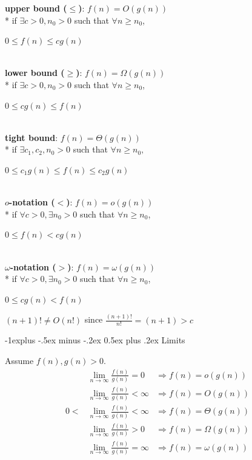\documentclass[10pt, landscape]{article}
\makeatletter
\renewcommand{\subsection}{\@startsection{subsection}{2}{0mm}%
  {-1explus -.5ex minus -.2ex}%
  {0.5ex plus .2ex}%
{\normalfont\normalsize\bfseries}}
\makeatother
\begin{document}
\begin{multicols*}{4}
  \begin{tightcenter}
    \textbf{upper bound ($\leq$)}: $f(n) = O(g(n))$
    \\* if $\exists c>0, n_0>0$ such that $\forall n \geq n_0$, 
    \begin{tightbox}
      $0 \leq f(n) \leq cg(n)$
    \end{tightbox}
    

    \ \\ \textbf{lower bound ($\geq$)}: $f(n) = \Omega(g(n))$
    \\* if $\exists c>0, n_0>0$ such that $\forall n \geq n_0$, 
    \begin{tightbox}
      $0 \leq cg(n) \leq f(n)$
    \end{tightbox}

    \ \\ \textbf{tight bound}: $f(n) = \Theta(g(n))$
    \\* if $\exists c_1, c_2, n_0>0$ such that $\forall n \geq n_0,$
    \begin{tightbox}
      $0 \leq c_1 g(n) \leq f(n) \leq c_2 g(n)$ 
    \end{tightbox}

    \ \\ \textbf{$o$-notation ($<$)}: $f(n) = o(g(n))$
    \\* if $\forall c>0, \exists n_0>0$ such that $\forall n \geq n_0$, 
    \begin{tightbox}
      $0 \leq f(n) < cg(n)$
    \end{tightbox}

    \ \\ \textbf{$\omega$-notation ($>$)}: $f(n) = \omega(g(n))$
    \\* if $\forall c>0, \exists n_0>0$ such that $\forall n \geq n_0$, 
    \begin{tightbox}
      $0 \leq cg(n) < f(n)$
    \end{tightbox}
  \end{tightcenter}

  \begin{niceproof}
    $(n+1)! \ne O(n!)$ since $\frac{(n+1)!}{n!}=(n+1)>c$
  \end{niceproof}

  \subsection{Limits}

  Assume $f(n), g(n) > 0$.
  \begin{align*}
    &\lim\limits_{n \to \infty} \frac{f(n)}{g(n)} = 0 &\Rightarrow f(n) = o(g(n)) \\
    &\lim\limits_{n \to \infty} \frac{f(n)}{g(n)} < \infty &\Rightarrow f(n) = O(g(n)) \\
    0 < &\lim\limits_{n \to \infty} \frac{f(n)}{g(n)} < \infty &\Rightarrow f(n) = \Theta(g(n)) \\
        &\lim\limits_{n \to \infty} \frac{f(n)}{g(n)} > 0 &\Rightarrow f(n) = \Omega(g(n)) \\
        &\lim\limits_{n \to \infty} \frac{f(n)}{g(n)} = \infty &\Rightarrow f(n) = \omega(g(n))
  \end{align*}


\end{multicols*}
\end{document}
